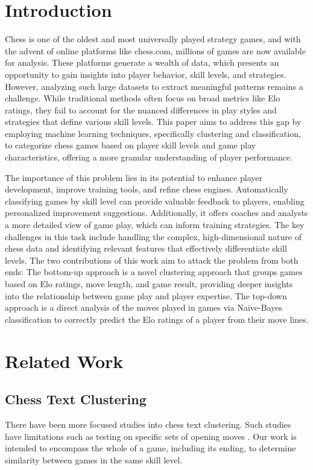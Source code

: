 \documentclass[conference]{IEEEtran}
\begin{document}
\section{Introduction}
Chess is one of the oldest and most universally played strategy games, and with the advent of online platforms like chess.com, millions of games are now available for analysis. These platforms generate a wealth of data, which presents an opportunity to gain insights into player behavior, skill levels, and strategies. However, analyzing such large datasets to extract meaningful patterns remains a challenge. While traditional methods often focus on broad metrics like Elo ratings, they fail to account for the nuanced differences in play styles and strategies that define various skill levels. This paper aims to address this gap by employing machine learning techniques, specifically clustering and classification, to categorize chess games based on player skill levels and game play characteristics, offering a more granular understanding of player performance.

The importance of this problem lies in its potential to enhance player development, improve training tools, and refine chess engines. Automatically classifying games by skill level can provide valuable feedback to players, enabling personalized improvement suggestions. Additionally, it offers coaches and analysts a more detailed view of game play, which can inform training strategies. The key challenges in this task include handling the complex, high-dimensional nature of chess data and identifying relevant features that effectively differentiate skill levels. The two contributions of this work aim to attack the problem from both ends: The bottom-up approach is a novel clustering approach that groups games based on Elo ratings, move length, and game result, providing deeper insights into the relationship between game play and player expertise. The top-down approach is a direct analysis of the moves played in games via Naive-Bayes classification to correctly predict the Elo ratings of a player from their move lines.

\section{Related Work}
\subsection{Chess Text Clustering}
There have been more focused studies into chess text clustering. Such studies have limitations such as testing on specific sets of opening moves \cite{b1}\cite{b2}. Our work is intended to encompass the whole of a game, including its ending, to determine similarity between games in the same skill level.
\end{document}
